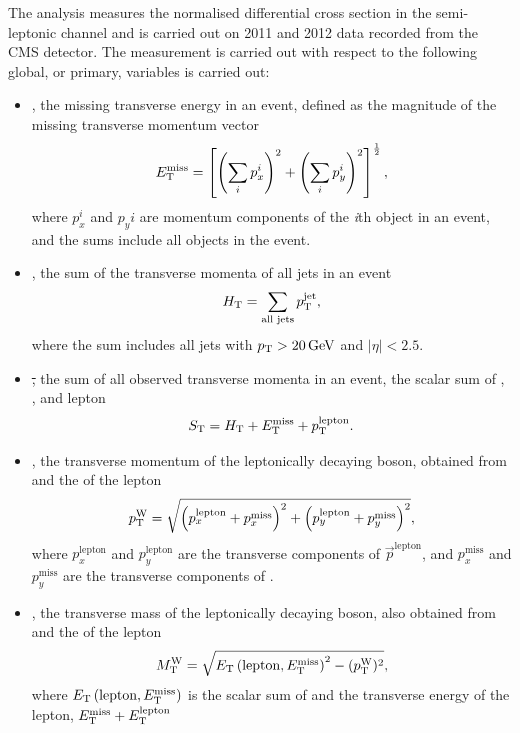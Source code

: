 The analysis measures the normalised differential \ttbar cross section in the semi-leptonic channel and is
carried out on 2011 and 2012 data recorded from the CMS detector. The measurement is carried out with respect
to the following global, or primary, variables is carried out:
\begin {itemize}

  \item {\met, the missing transverse energy in an event, defined as the magnitude of the missing transverse
  momentum vector \ptvecmiss}
  	\[E_{\mathrm{T}}^{\textrm{miss}} = \left[ \left(\sum_i{p_{x}^i}\right)^2 + \left(\sum_i{p_{y}^i}\right)^2
  	\right]^{\frac{1}{2}},\]
  	where $p_x^i$ and $p_yi$ are momentum components of the \textit{i}th object in an event, and the sums
  	include all objects in the event.

  \item {\HT, the sum of the transverse momenta of all jets in an event}
	\[H_{\mathrm{T}} = \sum_{\text{all jets}}p_{\mathrm{T}}^{\mathrm{jet}},\]
	where the sum includes all jets with  $p_{\mathrm{T}}>20\,\text{Ge\hspace{-.08em}V}$ and $\left|\eta\right|<2.5$.

  \item {\st, the sum of all observed transverse momenta in an event, \ie the scalar sum of \HT, \met, and
  	lepton \pt}
  	\[S_{\mathrm{T}} = H_{\mathrm{T}} + E_{\mathrm{T}}^{\textrm{miss}} + p_\mathrm{T}^\mathrm{lepton}.\]

  \item {\wpt, the transverse momentum of the leptonically decaying \W boson, obtained from \met and the \pt
  of the lepton}
	\[p_\mathrm{T}^{\mathrm{W}} = \sqrt{\left(p_x^{\mathrm{lepton}} + p_x^{\mathrm{miss}}\right)^2 + \left(p_y^{\mathrm{lepton}} +
	p_y^{\mathrm{miss}}\right)^2},\]
	where $p_{x}^{\mathrm{lepton}}$ and $p_{y}^{\mathrm{lepton}}$ are the transverse components of
	$\vec{p}^{\mathrm{lepton}}$, and $p_x^{\mathrm{miss}}$ and $p_y^{\mathrm{miss}}$ are the transverse
	components of \ptvecmiss.

  \item {\mt, the transverse mass of the leptonically decaying \W boson, also obtained from \met and the \pt
  of the lepton}
    \[M_\mathrm{T}^{\mathrm{W}} = \sqrt{E_{\mathrm{T}}\left(\text{lepton}, E_{\mathrm{T}}^{\textrm{miss}}\right)^{2} - (p_\mathrm{T}^{\mathrm{W}})^{2}},\]
    where $E_{\mathrm{T}}\left(\text{lepton}, E_{\mathrm{T}}^{\textrm{miss}}\right)$ is the scalar sum of \met and the transverse energy of the
    lepton, \ie $E_{\mathrm{T}}^{\textrm{miss}} + E_{\mathrm{T}}^{\text{lepton}}$
 
\end{itemize}


